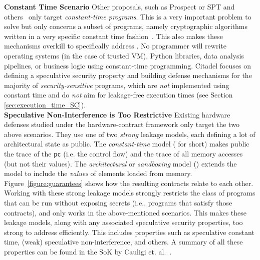 \noindent\textbf{Constant Time Scenario}
Other proposals, such as Prospect \cite{daniel2023prospect} or SPT \cite{choudhary2021speculative} and others~\cite{barthe2021high, cauligi2020constant, daniel2021hunting, guanciale2020inspectre, guarnieri2020spectector, patrignani2021exorcising, vassena2021automatically} only target \emph{constant-time programs}.
This is a very important problem to solve but only concerns a subset of programs, namely cryptographic algorithms written in a very specific constant time fashion~\cite{almeida2016verifying}.
This also makes these mechanisms overkill to specifically address \prob{}.
No programmer will rewrite operating systems (in the case of trusted VM), Python libraries, data analysis pipelines, or business logic using constant-time programming.
Citadel focuses on defining a speculative security property and building defense mechanisms for the majority of \emph{security-sensitive} programs, which are \emph{not} implemented using constant time and do \emph{not} aim for leakage-free execution times (see Section \ref{sec:execution_time_SC}).
\\

\noindent\textbf{Speculative Non-Interference is Too Restrictive}
\label{sec:limitationsspecsec}
Existing hardware defenses studied under the hardware-contract framework only target the two above scenarios.
They use one of two \emph{strong} leakage models, each defining a lot of architectural state as public.
The \emph{constant-time} model ( for short) makes public the trace of the \texttt{pc} (i.e. the control flow) and the trace of all memory accesses (but not their values).
The \emph{architectural} or \emph{sandboxing} model () extends the  model to include the \emph{values} of elements loaded from memory. 
Figure~\ref{figure:guarantees} shows how the resulting contracts relate to each other.
Working with these strong leakage models strongly restricts the class of programs that can be run without exposing secrets (i.e., programs that satisfy those contracts), and only works in the above-mentioned scenarios.
This makes these leakage models, along with any associated speculative security properties, too strong to address \prob{} efficiently.
This includes properties such as speculative constant time, (weak) speculative non-interference, and others.
A summary of all these properties can be found in the SoK by Cauligi et. al.~\cite{cauligi2022sok}.